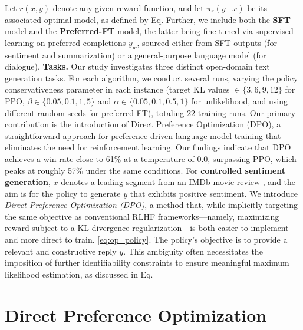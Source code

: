 \begin{lemma}
\begin{sproof}
    Let $r(x, y)$ denote any given reward function, and let $\pi_r(y \mid x)$ be its associated optimal model, as defined by Eq. Further, we include both the \textbf{SFT} model and the \textbf{Preferred-FT} model, the latter being fine-tuned via supervised learning on preferred completions $y_w$, sourced either from SFT outputs (for sentiment and summarization) or a general-purpose language model (for dialogue). \textbf{Tasks.} Our study investigates three distinct open-domain text generation tasks. For each algorithm, we conduct several runs, varying the policy conservativeness parameter in each instance (target KL values $\in\{3,6,9,12\}$ for PPO, $\beta \in \{0.05,0.1,1,5\}$ and $\alpha\in\{0.05,0.1,0.5,1\}$ for unlikelihood, and using different random seeds for preferred-FT), totaling 22 training runs. Our primary contribution is the introduction of Direct Preference Optimization (DPO), a straightforward approach for preference-driven language model training that eliminates the need for reinforcement learning. Our findings indicate that DPO achieves a win rate close to 61\% at a temperature of 0.0, surpassing PPO, which peaks at roughly 57\% under the same conditions. For \textbf{controlled sentiment generation}, $x$ denotes a leading segment from an IMDb movie review \cite{maas-EtAl:2011:ACL-HLT2011}, and the aim is for the policy to generate $y$ that exhibits positive sentiment. We introduce \textit{Direct Preference Optimization (DPO)}, a method that, while implicitly targeting the same objective as conventional RLHF frameworks—namely, maximizing reward subject to a KL-divergence regularization—is both easier to implement and more direct to train. \ref{eq:op_policy}. The policy’s objective is to provide a relevant and constructive reply $y$. This ambiguity often necessitates the imposition of further identifiability constraints to ensure meaningful maximum likelihood estimation, as discussed in Eq. \section{Direct Preference Optimization}\label{sec:DPO}


\end{sproof}
\end{lemma}
